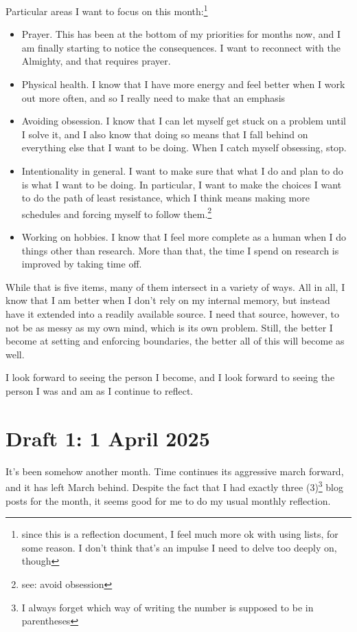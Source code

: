 \documentclass[12pt]{article}[titlepage]
\renewcommand{\,}{\textsuperscript{,}}
\begin{document}
Particular areas I want to focus on this month:\footnote{since this is a reflection document, I feel much more ok with using lists, for some reason. I don't think that's an impulse I need to delve too deeply on, though}  
\begin{itemize}  
\item Prayer. This has been at the bottom of my priorities for months now, and I am finally starting to notice the consequences. I want to reconnect with the Almighty, and that requires prayer.  
\item Physical health. I know that I have more energy and feel better when I work out more often, and so I really need to make that an emphasis  
\item Avoiding obsession. I know that I can let myself get stuck on a problem until I solve it, and I also know that doing so means that I fall behind on everything else that I want to be doing. When I catch myself obsessing, stop.  
\item Intentionality in general. I want to make sure that what I do and plan to do is what I want to be doing. In particular, I want to make the choices I want to do the path of least resistance, which I think means making more schedules and forcing myself to follow them.\footnote{see: avoid obsession}  
\item Working on hobbies. I know that I feel more complete as a human when I do things other than research. More than that, the time I spend on research is improved by taking time off.  
\end{itemize}

While that is five items, many of them intersect in a variety of ways.  
All in all, I know that I am better when I don't rely on my internal memory, but instead have it extended into a readily available source.  
I need that source, however, to not be as messy as my own mind, which is its own problem.  
Still, the better I become at setting and enforcing boundaries, the better all of this will become as well.

I look forward to seeing the person I become, and I look forward to seeing the person I was and am as I continue to reflect.

\section{Draft 1: 1 April 2025}  
It's been somehow another month.  
Time continues its aggressive march forward, and it has left March behind.  
Despite the fact that I had exactly three (3)\footnote{I always forget which way of writing the number is supposed to be in parentheses} blog posts for the month, it seems good for me to do my usual monthly reflection.
\end{document}
